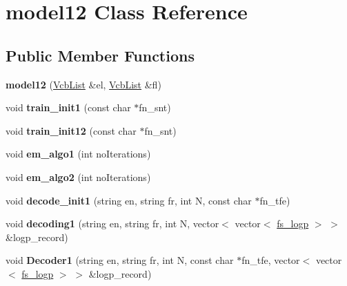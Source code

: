 \hypertarget{classmodel12}{\section{model12 \-Class \-Reference}
\label{classmodel12}
}
\subsection*{\-Public \-Member \-Functions}
\begin{DoxyCompactItemize}
\item 
\hypertarget{classmodel12_ac9899d4aafb023670c4665b61ac12a13}{{\bfseries model12} (\hyperlink{classVcbList}{\-Vcb\-List} \&el, \hyperlink{classVcbList}{\-Vcb\-List} \&fl)}\label{classmodel12_ac9899d4aafb023670c4665b61ac12a13}

\item 
\hypertarget{classmodel12_ac5e48f27902f26da21549bd8776f8582}{void {\bfseries train\-\_\-init1} (const char $\ast$fn\-\_\-snt)}\label{classmodel12_ac5e48f27902f26da21549bd8776f8582}

\item 
\hypertarget{classmodel12_a1bfc975a2617a9bdff4b146d2b44b6bf}{void {\bfseries train\-\_\-init12} (const char $\ast$fn\-\_\-snt)}\label{classmodel12_a1bfc975a2617a9bdff4b146d2b44b6bf}

\item 
\hypertarget{classmodel12_a2bc93784c08792fef38a1992eaf93294}{void {\bfseries em\-\_\-algo1} (int no\-Iterations)}\label{classmodel12_a2bc93784c08792fef38a1992eaf93294}

\item 
\hypertarget{classmodel12_a1e24f8bfffa81361466b4be900d1cb00}{void {\bfseries em\-\_\-algo2} (int no\-Iterations)}\label{classmodel12_a1e24f8bfffa81361466b4be900d1cb00}

\item 
\hypertarget{classmodel12_a6d7c56e6a21afaae7d192e12adcea712}{void {\bfseries decode\-\_\-init1} (string en, string fr, int \-N, const char $\ast$fn\-\_\-tfe)}\label{classmodel12_a6d7c56e6a21afaae7d192e12adcea712}

\item 
\hypertarget{classmodel12_a813bd62a8d10224b8a7681502117ea0f}{void {\bfseries decoding1} (string en, string fr, int \-N, vector$<$ vector$<$ \hyperlink{classfs__logp}{fs\-\_\-logp} $>$ $>$ \&logp\-\_\-record)}\label{classmodel12_a813bd62a8d10224b8a7681502117ea0f}

\item 
\hypertarget{classmodel12_a21159f3783dac48471ed3aab67dc7dd3}{void {\bfseries \-Decoder1} (string en, string fr, int \-N, const char $\ast$fn\-\_\-tfe, vector$<$ vector$<$ \hyperlink{classfs__logp}{fs\-\_\-logp} $>$ $>$ \&logp\-\_\-record)}\label{classmodel12_a21159f3783dac48471ed3aab67dc7dd3}


\end{DoxyCompactItemize}
